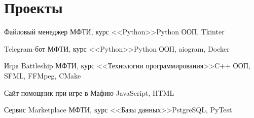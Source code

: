 \section{\textbf{Проекты}}
\resumeSubHeadingListStart

\resumeSubHeading
{Файловый менеджер}{\href{https://github.com/NTheme/FileExplorer-Python}{}}
{МФТИ, курс <<Python>>}{Python ООП, Tkinter}

\resumeSubHeading
{Telegram-бот}{\href{https://github.com/NTheme/TGBot-Weather}{}}
{МФТИ, курс <<Python>>}{Python ООП, aiogram, Docker}

\resumeSubHeading
{Игра Battleship}{\href{https://github.com/NTheme/Battleship}{}}
{МФТИ, курс <<Технологии программирования>>}{C++ ООП, SFML, FFMpeg, CMake}

\resumeSubHeading
{Сайт-помощник при игре в Мафию}{\href{https://github.com/NTheme/Mafia}{}}
{\href{https://ntheme.github.io/Mafia/}{}}{JavaScript, HTML}

\resumeSubHeading
{Сервис Marketplace}{\href{https://github.com/NTheme/Marketplace}{}}
{МФТИ, курс <<Базы данных>>}{PstgreSQL, PyTest}

\resumeSubHeadingListEnd

